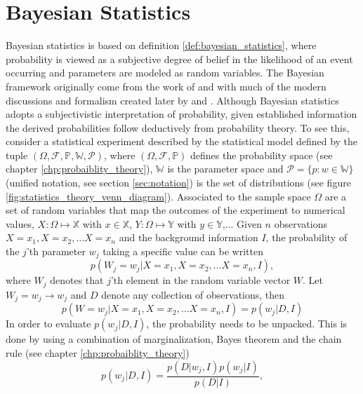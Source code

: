 \chapter{Bayesian Statistics}
\label{chp:bay}
Bayesian statistics is based on definition \ref{def:bayesian_statistics}, where probability is viewed as a subjective degree of belief in the likelihood of an event occurring and parameters are modeled as random variables. The Bayesian framework originally come from the work of \citet{Bayes:63} and \citet{laplace_thorie_1812} with much of the modern discussions and formalism created later by \citet{Finetti1937LaP,Jeffreys1940} and \citet{Savage1954}. Although Bayesian statistics adopts a subjectivistic interpretation of probability, given established information the derived probabilities follow deductively from probability theory. To see this, consider a statistical experiment described by the statistical model defined by the tuple $(\Omega, \mathcal{F}, \mathbb{P},\mathbb{W},\mathcal{P})$, where $(\Omega, \mathcal{F}, \mathbb{P})$ defines the probability space (see chapter \ref{chp:probaiblity_theory}), $\mathbb{W}$ is the parameter space and $\mathcal{P}=\{p: w \in \mathbb{W}\}$ (unified notation, see section \ref{sec:notation}) is the set of distributions (see figure \ref{fig:statistics_theory_venn_diagram}). Associated to the sample space $\Omega$ are a set of random variables that map the outcomes of the experiment to numerical values, $X:\Omega \mapsto \mathbb{X}$ with $x\in \mathbb{X}$, $Y:\Omega \mapsto \mathbb{Y}$ with $y\in \mathbb{Y}$,... Given $n$ observations $X=x_1, X=x_2,\dots X = x_n$ and the background information $I$, the probability of the $j$'th parameter $w_j$ taking a specific value can be written
\begin{equation}
	p(W_j=w_j|X=x_1, X=x_2,\dots X = x_n, I),
	\label{eq:pa1}
\end{equation}
where $W_j$ denotes that $j$'th element in the random variable vector $W$. Let $W_j=w_j\rightarrow w_j$ and $D$ denote any collection of observations, then 
\begin{equation}
	p(W=w_j|X=x_1, X=x_2,\dots X = x_n, I) = p(w_j|D,I)
\end{equation}
In order to evaluate $p(w_j|D,I)$, the probability needs to be unpacked. This is done by using a combination of marginalization, Bayes theorem and the chain rule (see chapter \ref{chp:probaiblity_theory})
\begin{equation}
		p(w_j|D,I) = \frac{p(D|w_j,I)p(w_j|I)}{p(D|I)},
	\label{eq:pa2}
\end{equation}
